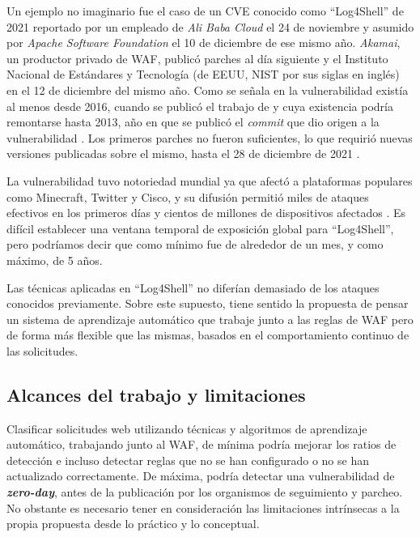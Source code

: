 \documentclass[12pt]{article}
\begin{document}
Un ejemplo no imaginario fue el caso de un CVE conocido como \enquote{Log4Shell} de 2021 reportado por un empleado de \textit{Ali Baba Cloud} el 24 de noviembre y asumido por \textit{Apache Software Foundation} el 10 de diciembre de ese mismo año. \textit{Akamai}, un productor privado de WAF, publicó parches al día siguiente \cite{akamai2021log4j} y el Instituto Nacional de Estándares y Tecnología (de EEUU, NIST por sus siglas en inglés) en \cite{nvd2021-44228} el 12 de diciembre del mismo año. Como se señala en \cite{hiesgen2022race} la vulnerabilidad existía al menos desde 2016, cuando se publicó el trabajo de \cite{munoz2016jndi} y cuya existencia podría remontarse hasta 2013, año en que se publicó el \textit{commit} que dio origen a la vulnerabilidad \cite{apache2013log4j2commit}. Los primeros parches no fueron suficientes, lo que requirió nuevas versiones publicadas sobre el mismo, hasta el 28 de diciembre de 2021 \cite{nvd2021-44832}.

La vulnerabilidad tuvo notoriedad mundial ya que afectó a plataformas populares como Minecraft, Twitter y Cisco, y su difusión permitió miles de ataques efectivos en los primeros días y cientos de millones de dispositivos afectados \cite{unraveling2025log4shell}. Es difícil establecer una ventana temporal de exposición global para \enquote{Log4Shell}, pero podríamos decir que como mínimo fue de alrededor de un mes, y como máximo, de 5 años.

Las técnicas aplicadas en \enquote{Log4Shell} no diferían demasiado de los ataques conocidos previamente. Sobre este supuesto, tiene sentido la propuesta de pensar un sistema de aprendizaje automático que trabaje junto a las reglas de WAF pero de forma más flexible que las mismas, basados en el comportamiento continuo de las solicitudes.

\subsection{Alcances del trabajo y limitaciones}
Clasificar solicitudes web utilizando técnicas y algoritmos de aprendizaje automático, trabajando junto al WAF, de mínima podría mejorar los ratios de detección e incluso detectar reglas que no se han configurado o no se han actualizado correctamente. De máxima, podría detectar una vulnerabilidad de \textbf{\textit{zero-day}}, antes de la publicación por los organismos de seguimiento y parcheo. No obstante es necesario tener en consideración las limitaciones intrínsecas a la propia propuesta desde lo práctico y lo conceptual.
\end{document}
